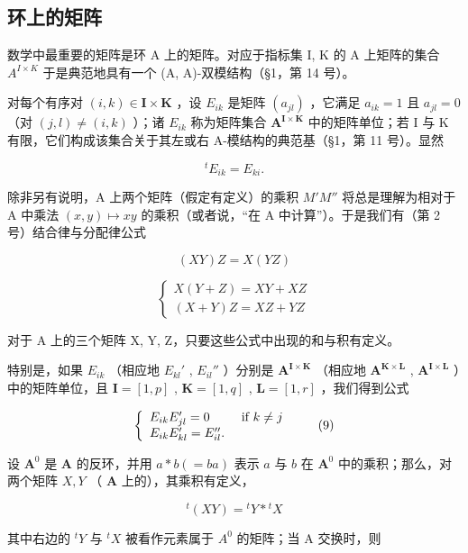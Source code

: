 \subsection{环上的矩阵}

数学中最重要的矩阵是环 A 上的矩阵。对应于指标集 I, K 的 A 上矩阵的集合 \(A^{I \times K}\) 于是典范地具有一个 (A, A)-双模结构（§1，第 14 号）。

对每个有序对 \((i,k)\in\mathbf{I}\times\mathbf{K}\) ，设 \(E_{ik}\) 是矩阵 \((a_{jl})\) ，它满足 \(a_{ik}=1\) 且 \(a_{jl}=0\) （对 \((j,l)\neq(i,k)\) ）；诸 \(E_{ik}\) 称为矩阵集合 \(\mathbf{A}^{\mathbf{I}\times\mathbf{K}}\) 中的矩阵单位；若 I 与 K 有限，它们构成该集合关于其左或右 A-模结构的典范基（§1，第 11 号）。显然

\[
{ } ^ { t } E _ { i k } = E _ { k i } .
\]

除非另有说明，A 上两个矩阵（假定有定义）的乘积 \(M'M''\) 将总是理解为相对于 A 中乘法 \((x,y)\mapsto xy\) 的乘积（或者说，“在 A 中计算”）。于是我们有（第 2 号）结合律与分配律公式

\[
(X Y) Z = X (Y Z)\tag{7}
\]

\[
\left\{ \begin{array}{l} X (Y + Z) = X Y + X Z \\ (X + Y) Z = X Z + Y Z \end{array} \right.\tag{8}
\]

对于 A 上的三个矩阵 X, Y, Z，只要这些公式中出现的和与积有定义。

特别是，如果 \(E_{ik}\) （相应地 \(E_{kl}'\) , \(E_{il}''\) ）分别是 \(\mathbf{A}^{\mathbf{I} \times \mathbf{K}}\) （相应地 \(\mathbf{A}^{\mathbf{K} \times \mathbf{L}}\) , \(\mathbf{A}^{\mathbf{I} \times \mathbf{L}}\) ）中的矩阵单位，且 \(\mathbf{I} = [1, p]\) , \(\mathbf{K} = [1, q]\) , \(\mathbf{L} = [1, r]\) ，我们得到公式

\[
\left\{ \begin{array}{l l} E _ {i k} E _ {j l} ^ {\prime} = 0 & \text { if } k \neq j \\ E _ {i k} E _ {k l} ^ {\prime} = E _ {i l} ^ {\prime \prime}. \end{array} \right.\tag{9}
\]

设 \(\mathbf{A}^0\) 是 \(\mathbf{A}\) 的反环，并用 \(a * b (= ba)\) 表示 \(a\) 与 \(b\) 在 \(\mathbf{A}^0\) 中的乘积；那么，对两个矩阵 \(X, Y\) （ \(\mathbf{A}\) 上的），其乘积有定义，

\[
{ } ^ { t } ( X Y ) = { } ^ { t } Y * { } ^ { t } X\tag{10}
\]

其中右边的 \(^{t}Y\) 与 \(^{t}X\) 被看作元素属于 \(A^{0}\) 的矩阵；当 A 交换时，则

